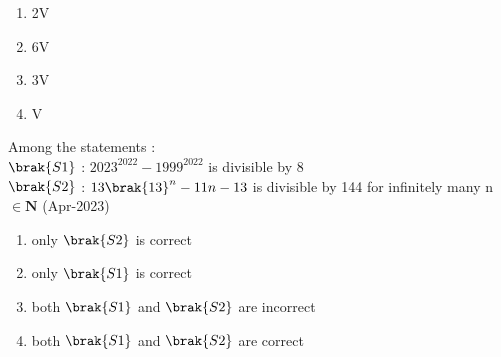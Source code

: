     \begin{multicols}{4} 
    \begin{enumerate}
        \item 2V
        \item 6V
        \item 3V
        \item V
    \end{enumerate} 
    \end{multicols}
\item Among the statements : \\
    $\brak{S1}$ : $2023^{2022}-1999^{2022}$ is divisible by $8$ \\
    $\brak{S2}$ : $13\brak{13}^{n}-11n-13$ is divisible by 144 for infinitely many n $\in \mathbf{N}$ \hfill(Apr-2023)
    \begin{multicols}{2}
    \begin{enumerate}
        \item only $\brak{S2}$ is correct
        \item only $\brak{S1}$ is correct
        \item both $\brak{S1}$ and $\brak{S2}$ are incorrect
        \item both $\brak{S1}$ and $\brak{S2}$ are correct
    \end{enumerate} 
    \end{multicols}

